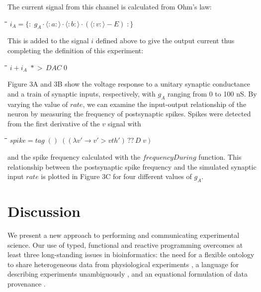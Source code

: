 \documentclass[11pt]{article}
\newlength{\lwidth}\setlength{\lwidth}{4.5cm}
\newlength{\cwidth}\setlength{\cwidth}{8mm} %
\newcommand{\Conid}[1]{\mathit{#1}}
\newcommand{\Varid}[1]{\mathit{#1}}
\begin{document}
The current signal from this channel is calculated from Ohm's law:
\begin{tabbing}
\qquad\=\hspace{\lwidth}\=\hspace{\cwidth}\=\+\kill
${i_{A}\mathrel{=}\{\!:\!\;g_{A}\!\cdot\!\langle:\Varid{a}:\rangle\!\cdot\!\langle:\Varid{b}:\rangle\!\cdot\!(\langle:\Varid{v}:\rangle\mathbin{-}\Conid{E})\;\!:\!\}}$
\end{tabbing}This is added to the signal \ensuremath{\Varid{i}} defined above to give the output current
thus completing the definition of this experiment:
\begin{tabbing}
\qquad\=\hspace{\lwidth}\=\hspace{\cwidth}\=\+\kill
${\Varid{i}\mathbin{+}i_{A}\,\,*\!\!\!>\,\Conid{DAC}\;\mathrm{0}}$
\end{tabbing}
Figure 3A and 3B show the voltage response to a unitary synaptic
conductance and a train of synaptic inputs, respectively, with \ensuremath{g_{A}}
ranging from 0 to 100 nS. By varying the value of \ensuremath{\Varid{rate}}, we can
examine the input-output relationship of the neuron by measuring the
frequency of postsynaptic spikes. Spikes were detected from the first
derivative of the \ensuremath{\Varid{v}} signal with
\begin{tabbing}
\qquad\=\hspace{\lwidth}\=\hspace{\cwidth}\=\+\kill
${\Varid{spike}\mathrel{=}\Varid{tag}\;()\;((\lambda \Varid{v'}\to \Varid{v'}\mathbin{>}\Varid{vth'})\,??\,\Conid{D}\;\Varid{v})}$
\end{tabbing}and the spike frequency calculated with the \ensuremath{\Varid{frequencyDuring}} function.
This relationship between the postsynaptic spike frequency and the
simulated synaptic input \ensuremath{\Varid{rate}} is plotted in Figure 3C for four
different values of \ensuremath{g_{A}}. 
\section*{Discussion}

We present a new approach to performing and communicating
experimental science.  Our use of
typed, functional and reactive programming overcomes at least three
long-standing issues in bioinformatics: the need for a flexible
ontology to share heterogeneous data from physiological experiments
\citep{Amari2002}, a language for describing experiments unambiguously
\citep{Murray-Rust2002}, and an equational formulation of data
provenance \citep{Pool2002}. 
\end{document}
